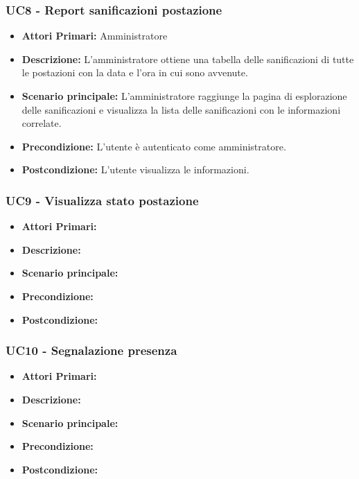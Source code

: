 \subsubsection{ UC8 - Report sanificazioni postazione}
\begin{itemize}
           	\item\textbf{Attori Primari:} 
           	Amministratore
           	\item\textbf{Descrizione:} 
           	L'amministratore ottiene una tabella delle sanificazioni di tutte le postazioni con la data e l'ora in cui sono avvenute.
           	\item\textbf{Scenario principale:} 
           	L'amministratore raggiunge la pagina di esplorazione delle sanificazioni e visualizza la lista delle sanificazioni con le informazioni correlate.
           	\item\textbf{Precondizione:} 
           	L'utente è autenticato come amministratore.
           	\item\textbf{Postcondizione:}
           	L'utente visualizza le informazioni.
\end{itemize}

\subsubsection{ UC9 - Visualizza stato postazione}
\begin{itemize}
           	\item\textbf{Attori Primari:} 
           	\item\textbf{Descrizione:} 
           	\item\textbf{Scenario principale:} 
           	\item\textbf{Precondizione:} 
           	\item\textbf{Postcondizione:}
\end{itemize}

\subsubsection{ UC10 - Segnalazione presenza}
\begin{itemize}
           	\item\textbf{Attori Primari:} 
           	\item\textbf{Descrizione:} 
           	\item\textbf{Scenario principale:} 
           	\item\textbf{Precondizione:} 
           	\item\textbf{Postcondizione:}
\end{itemize}

